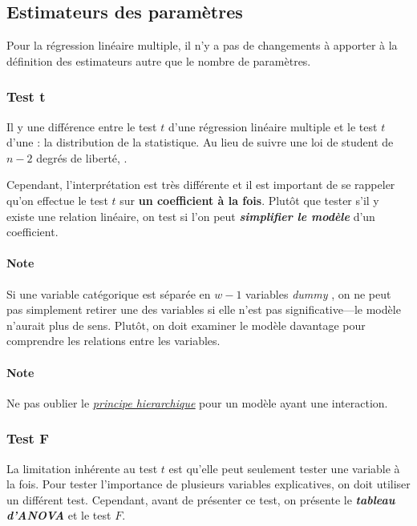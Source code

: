 \documentclass[french]{article}
\begin{document}
\begin{multicols*}{2}
\columnbreak
\subsection{Estimateurs des paramètres}
\begin{rappel_enhanced}[Contexte]
Pour la régression linéaire multiple, il n'y a pas de changements à apporter à la définition des estimateurs autre que le nombre de paramètres.
\end{rappel_enhanced}

\subsubsection{Test t}
\begin{rappel_enhanced}[Contexte]
Il y une différence entre le test $t$ d'une régression linéaire multiple et le test $t$ d'une \textit{\underline{}} : la distribution de la statistique. Au lieu de suivre une loi de student de $n - 2$ degrés de liberté, .

\bigskip

Cependant, l'interprétation est très différente et il est important de se rappeler qu'on effectue le test $t$ sur \textbf{un coefficient à la fois}. Plutôt que tester s'il y existe une relation linéaire, on test si l'on peut \textbf{\textit{simplifier le modèle}} d'un coefficient.
\end{rappel_enhanced}

\paragraph{Note}	Si une variable catégorique est séparée en $w - 1$ variables \og \textit{dummy} \fg{}, on ne peut pas simplement retirer une des variables si elle n'est pas significative---le modèle n'aurait plus de sens. Plutôt, on doit examiner le modèle davantage pour comprendre les relations entre les variables.

\paragraph{Note}	Ne pas oublier le \textit{\color{bleudefrance}\underline{\hyperlink{hierachicalPrincipleMLR}{\color{bleudefrance} principe hierarchique}}} pour un modèle ayant une interaction.



\subsubsection{Test F}
\begin{rappel_enhanced}[Contexte]
La limitation inhérente au test $t$ est qu'elle peut seulement tester une variable à la fois. Pour tester l'importance de plusieurs variables explicatives, on doit utiliser un différent test. Cependant, avant de présenter ce test, on présente le \textbf{\textit{tableau d'ANOVA}} et le test $F$.
\end{rappel_enhanced}


\end{multicols*}
\end{document}

